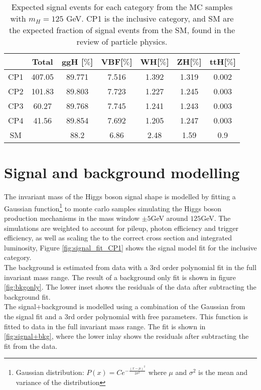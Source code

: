 \documentclass[10pt, aps, twocolumn, a4paper, nofootinbib]{revtex4}
\begin{document}
\begin{table}
\centering 
\caption{Expected signal events for each category from the MC samples with $m_{H} = 125$ GeV. CP1 is the inclusive category, and SM are the expected fraction of signal events from the SM, found in the review of particle physics. \citep{PhysRevD.98.030001.2018}  \label{tab:signal_yield}}
\setlength{\tabcolsep}{4pt} %
\begin{tabular}{ c  c  c  c  c  c  c}
\hline
& Total & ggH [$\%$] & VBF[$\%$] & WH[$\%$] & ZH[$\%$] & ttH[$\%$] \\
\hline
CP1 & 407.05 & 89.771 & 7.516 & 1.392 & 1.319 & 0.002 \\
CP2 & 101.83 & 89.803 & 7.723 & 1.227 & 1.245 & 0.003 \\
CP3 &  60.27 & 89.768 & 7.745 & 1.241 & 1.243 & 0.003\\
CP4 &  41.56 & 89.854 & 7.692 & 1.205 & 1.247 & 0.003\\
\hline
SM  & & 88.2 & 6.86 & 2.48 & 1.59 & 0.9 \\
\hline
\end{tabular}
\end{table}

\section{Signal and background modelling}

The invariant mass of the Higgs boson signal shape is modelled by fitting a Gaussian function\footnote{Gaussian distribution: $P(x) = C e^{-\frac{(x-\mu)^2}{2\sigma^2}}$ where $\mu$ and $\sigma^2$ is the mean and variance of the distribution} to monte carlo samples simulating the Higgs boson production mechanisms in the mass window $\pm 5$GeV around $125$GeV. The simulations are weighted to account for pileup, photon efficiency and trigger efficiency, as well as scaling the to the correct cross section and integrated luminosity, Figure \ref{fig:signal_fit_CP1} shows the signal model fit for the inclusive category. \\


The background is estimated from data with a 3rd order polynomial fit in the full invariant mass range. The result of a background only fit is shown in figure \ref{fig:bkgonly}. The lower inset shows the residuals of the data after subtracting the background fit. \\


The signal+background is modelled using a combination of the Gaussian from the signal fit and a 3rd order polynomial with free parameters. This function is fitted to data in the full invariant mass range. The fit is shown in \ref{fig:signal+bkg}, where the lower inlay shows the residuals after subtracting the fit from the data. 
\end{document}
